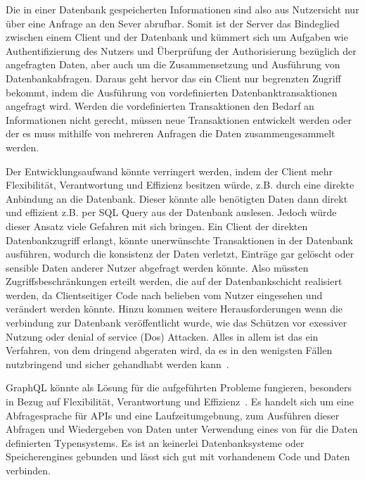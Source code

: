 Die in einer Datenbank gespeicherten Informationen sind also aus Nutzersicht nur über eine Anfrage an den Sever abrufbar.
Somit ist der Server das Bindeglied zwischen einem Client und der Datenbank und kümmert sich um Aufgaben wie Authentifizierung des Nutzers
und Überprüfung der Authorisierung bezüglich der angefragten Daten, aber auch um die Zusammensetzung und Ausführung von Datenbankabfragen.
Daraus geht hervor das ein Client nur begrenzten Zugriff bekommt, indem die Ausführung von vordefinierten Datenbanktransaktionen
angefragt wird. Werden die vordefinierten Transaktionen den Bedarf an Informationen nicht gerecht, müssen neue Transaktionen entwickelt werden
oder der es muss mithilfe von mehreren Anfragen die Daten zusammengesammelt werden.

Der Entwicklungsaufwand könnte verringert werden, indem der Client mehr Flexibilität, Verantwortung und Effizienz besitzen würde,
z.B. durch eine direkte Anbindung an die Datenbank.
Dieser könnte alle benötigten Daten dann direkt und effizient z.B. per SQL Query aus der Datenbank auslesen.
Jedoch würde dieser Ansatz viele Gefahren mit sich bringen. Ein Client der direkten Datenbankzugriff erlangt,
könnte unerwünschte Transaktionen in der Datenbank ausführen, wodurch die konsistenz der Daten verletzt,
Einträge gar gelöscht oder sensible Daten anderer Nutzer abgefragt werden könnte. Also müssten Zugriffsbeschränkungen erteilt werden, die
auf der Datenbankschicht realisiert werden, da Clientseitiger Code nach belieben vom Nutzer eingesehen und verändert werden könnte.
Hinzu kommen weitere Herausforderungen wenn die verbindung zur Datenbank veröffentlicht wurde,
wie das Schützen vor exessiver Nutzung oder denial of service (Dos) Attacken.
Alles in allem ist das ein Verfahren, von dem dringend abgeraten wird, da es in den wenigsten Fällen nutzbringend und sicher gehandhabt werden kann~\cite{client-to-database}.


GraphQL könnte als Lösung für die aufgeführten Probleme fungieren, besonders in Bezug auf Flexibilität, Verantwortung und Effizienz~\cite{graphql-scalablepath}.
Es handelt sich um eine Abfragesprache für APIs
und eine Laufzeitumgebnung, zum Ausführen dieser Abfragen und Wiedergeben von Daten unter Verwendung eines von für die Daten definierten Typensystems.
Es ist an keinerlei Datenbanksysteme oder Speicherengines gebunden und lässt sich gut mit vorhandenem Code und Daten verbinden.

